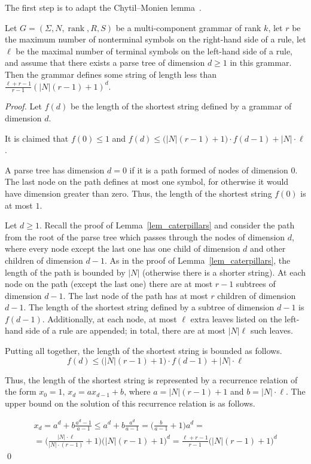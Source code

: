 \documentclass[runningheads]{llncs}
\newcommand{\ranksymb}{\mathop{\mathrm{rank}}}
\begin{document}
The first step is to adapt the Chytil--Monien lemma~\cite[Lem.~7]{ChytilMonien}.

\begin{lemma}\label{lem_caterpillarsmcfg}
Let $G=(\Sigma, N, \ranksymb, R, S)$ be a multi-component grammar of rank $k$,
let $r$ be the maximum number of nonterminal symbols on the right-hand side of a rule,
let $\ell$ be the maximal number of terminal symbols on the left-hand side of a rule,
and assume that there exists a parse tree of dimension $d \geqslant 1$ in this grammar.
Then the grammar defines some string
of length less than $\frac{\ell+r-1}{r-1} (|N|(r-1) + 1)^d$.
\end{lemma}
\begin{proof}
Let $f(d)$ be the length of the shortest string defined by a grammar of dimension $d$.

It is claimed that $f(0) \leqslant 1$
and $f(d) \leqslant \big(|N|(r-1)+1\big) \cdot f(d-1) + |N| \cdot \ell$.

A parse tree has dimension $d=0$
if it is a path formed of nodes of dimension 0.
The last node on the path defines at most one symbol,
for otherwise it would have dimension greater than zero.
Thus, the length of the shortest string $f(0)$ is at most $1$.

Let $d \geqslant 1$.
Recall the proof of Lemma~\ref{lem_caterpillars} and consider the path from the root 
of the parse tree which passes through the nodes of dimension $d$, where 
every node except the last one has one child of dimension $d$ and other children of dimension 
$d-1$.
As in the proof of Lemma~\ref{lem_caterpillars}, the length of the path is bounded by $|N|$
(otherwise there is a shorter string).
At each node on the path (except the last one)
there are at most $r-1$ subtrees of dimension $d-1$.
The last node of the path has at most $r$ children of dimension $d-1$.
The length of the shortest string defined by a subtree of dimension $d-1$ is $f(d-1)$.
Additionally, at each node, at most $\ell$ extra leaves
listed on the left-hand side of a rule are appended;
in total, there are at most $|N|\ell$ such leaves.

Putting all together, the length of the shortest string is bounded as follows. 
\begin{equation*}
	f(d)
		\leqslant
	\big(|N|(r-1)+1\big) \cdot f(d-1) + |N| \cdot \ell
\end{equation*}

Thus, the length of the shortest string is represented by a recurrence relation
of the form $x_0=1$, $x_d=ax_{d-1} + b$,
where $a=|N|(r-1)+1$ and $b=|N| \cdot \ell$. The upper bound on the solution of this
recurrence relation is as follows. 

\begin{multline*}
	x_d
		=
	a^d + b\frac{a^d-1}{a-1}
		\leqslant 
	a^d + b\frac{a^d}{a-1}
		=
	\Big(\frac{b}{a-1} + 1\Big)a^d
		= \\ =
	\Big(\frac{|N| \cdot \ell}{|N| \cdot (r-1)} + 1\Big)
	\big(|N|(r-1)+1\big)^d
		=
	\frac{\ell + r - 1}{r-1}
	\big(|N|(r-1)+1\big)^d
\end{multline*}
\qed
\end{proof}
\end{document}
